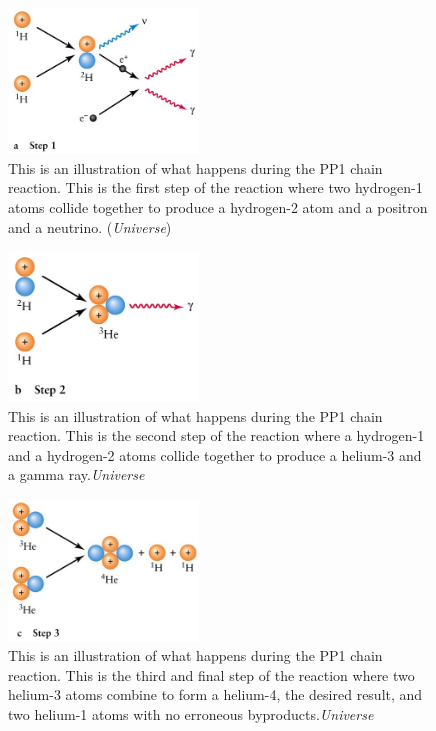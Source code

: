 \documentclass{article}
\begin{document}
\begin{figure}
  \centering
  \includegraphics[width=0.45\textwidth]{PP1.jpg}
  \caption{This is an illustration of what happens during the PP1 chain reaction. This is the first step of the reaction where two hydrogen-1 atoms collide together to produce a hydrogen-2 atom and a positron and a neutrino. (\textit{Universe})}
  \label{fig:PP1}
\end{figure}
\begin{figure}
  \centering
  \includegraphics[width=0.45\textwidth]{PP2.jpg}
  \caption{This is an illustration of what happens during the PP1 chain reaction. This is the second step of the reaction where a hydrogen-1 and a hydrogen-2 atoms collide together to produce a helium-3 and a gamma ray.\textit{Universe}}
  \label{fig:PP2}
\end{figure}
\begin{figure}
  \centering
  \includegraphics[width=0.45\textwidth]{PP3.jpg}
  \caption{This is an illustration of what happens during the PP1 chain reaction. This is the third and final step of the reaction where two helium-3 atoms combine to form a helium-4, the desired result, and two helium-1 atoms with no erroneous byproducts.\textit{Universe}}
  \label{fig:PP3}
\end{figure}
\end{document}
